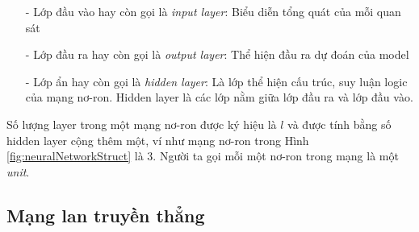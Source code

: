 \begin{itemize}
\setlength{\itemindent}{5mm}
	\item[-] Lớp đầu vào hay còn gọi là \textit{input layer}: Biểu diễn tổng quát của mỗi quan sát
	\item[-] Lớp đầu ra hay còn gọi là \textit{output layer}: Thể hiện đầu ra dự đoán của model
	\item[-] Lớp ẩn hay còn gọi là \textit{hidden layer}: Là lớp thể hiện cấu trúc, suy luận logic của mạng nơ-ron. Hidden layer là các lớp nằm giữa lớp đầu ra và lớp đầu vào.\end{itemize}\par
Số lượng layer trong một mạng nơ-ron được ký hiệu là $l$ và được tính bằng số hidden layer cộng thêm một, ví như mạng nơ-ron trong Hình \ref{fig:neuralNetworkStruct} là 3. Người ta gọi mỗi một nơ-ron trong mạng là một \textit{unit}.
%
\subsection{Mạng lan truyền thẳng}
